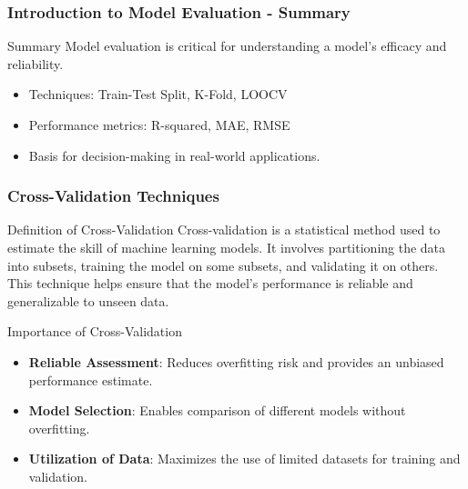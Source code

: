 \documentclass[aspectratio=169]{beamer}
\begin{document}
\begin{frame}[fragile]
    \frametitle{Introduction to Model Evaluation - Summary}
    \begin{block}{Summary}
        Model evaluation is critical for understanding a model's efficacy and reliability. 
        \begin{itemize}
            \item Techniques: Train-Test Split, K-Fold, LOOCV
            \item Performance metrics: R-squared, MAE, RMSE
            \item Basis for decision-making in real-world applications.
        \end{itemize}
    \end{block}
\end{frame}

\begin{frame}
    \frametitle{Cross-Validation Techniques}
    \begin{block}{Definition of Cross-Validation}
        Cross-validation is a statistical method used to estimate the skill of machine learning models. 
        It involves partitioning the data into subsets, training the model on some subsets, and validating it on others. 
        This technique helps ensure that the model's performance is reliable and generalizable to unseen data.
    \end{block}
    
    \begin{block}{Importance of Cross-Validation}
        \begin{itemize}
            \item \textbf{Reliable Assessment}: Reduces overfitting risk and provides an unbiased performance estimate.
            \item \textbf{Model Selection}: Enables comparison of different models without overfitting.
            \item \textbf{Utilization of Data}: Maximizes the use of limited datasets for training and validation.
        \end{itemize}
    \end{block}
\end{frame}
\end{document}
